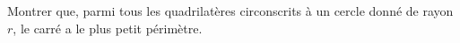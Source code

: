 Montrer que, parmi tous les quadrilatères circonscrits à un cercle donné de rayon $r$, le carré a le plus petit périmètre.
